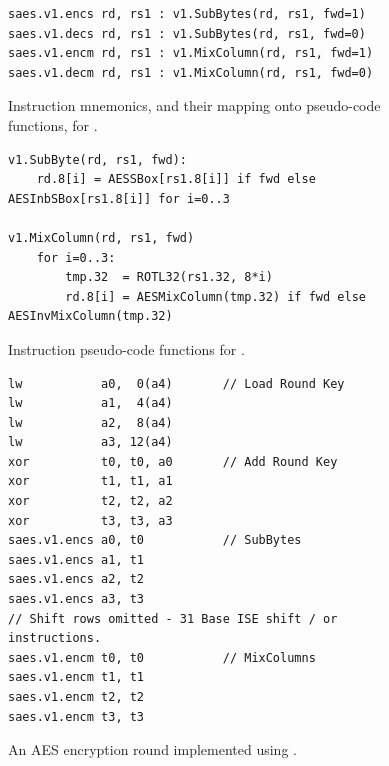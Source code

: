
\vspace*{\fill}

\begin{figure}[!h]
\begin{lstlisting}[language=pseudo,style=block]
saes.v1.encs rd, rs1 : v1.SubBytes(rd, rs1, fwd=1)
saes.v1.decs rd, rs1 : v1.SubBytes(rd, rs1, fwd=0)
saes.v1.encm rd, rs1 : v1.MixColumn(rd, rs1, fwd=1)
saes.v1.decm rd, rs1 : v1.MixColumn(rd, rs1, fwd=0)
\end{lstlisting}
\caption{
  Instruction mnemonics, and their mapping onto pseudo-code functions, for .
}
\label{fig:v1:mnemonics}
\end{figure}

\begin{figure}[!h]
\begin{lstlisting}[language=pseudo,style=block]
v1.SubByte(rd, rs1, fwd):
    rd.8[i] = AESSBox[rs1.8[i]] if fwd else AESInbSBox[rs1.8[i]] for i=0..3

v1.MixColumn(rd, rs1, fwd)
    for i=0..3:
        tmp.32  = ROTL32(rs1.32, 8*i)
        rd.8[i] = AESMixColumn(tmp.32) if fwd else AESInvMixColumn(tmp.32)
\end{lstlisting}
\caption{
  Instruction pseudo-code functions for .
}
\label{fig:v1:pseudo}
\end{figure}

\begin{figure}[!h]
\begin{lstlisting}[language=pseudo,style=block]
lw           a0,  0(a4)       // Load Round Key
lw           a1,  4(a4)
lw           a2,  8(a4)
lw           a3, 12(a4)
xor          t0, t0, a0       // Add Round Key
xor          t1, t1, a1
xor          t2, t2, a2
xor          t3, t3, a3
saes.v1.encs a0, t0           // SubBytes
saes.v1.encs a1, t1
saes.v1.encs a2, t2
saes.v1.encs a3, t3
// Shift rows omitted - 31 Base ISE shift / or instructions.
saes.v1.encm t0, t0           // MixColumns
saes.v1.encm t1, t1
saes.v1.encm t2, t2
saes.v1.encm t3, t3
\end{lstlisting}
\caption{
  An AES encryption round implemented using .
}
\label{fig:v1:round}
\end{figure}

\vspace*{\fill}


